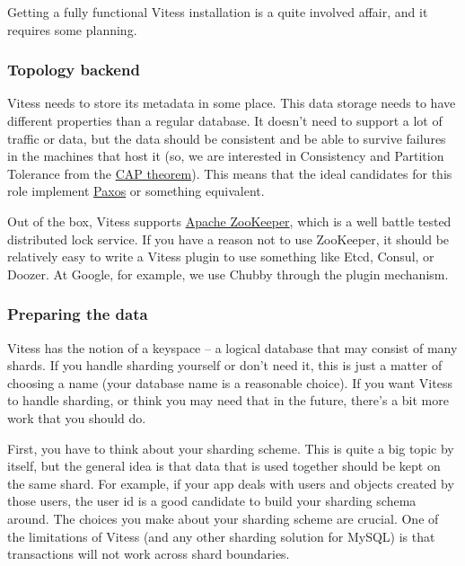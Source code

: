 Getting a fully functional Vitess installation is a quite involved affair, and
it requires some planning.

\subsubsection{Topology backend}\hypertarget{topology-backend}{}\label{topology-backend}

Vitess needs to store its metadata in some place. This data storage needs to
have different properties than a regular database. It doesn’t need to support a
lot of traffic or data, but the data should be consistent and be able to survive
failures in the machines that host it (so, we are interested in Consistency and
Partition Tolerance from the \href{http://en.wikipedia.org/wiki/CAP\_theorem}{CAP
theorem}). This means that the ideal candidates for this role implement
\href{http://en.wikipedia.org/wiki/Paxos\_(computer\_science)}{Paxos} or something
equivalent.

Out of the box, Vitess supports \href{http://zookeeper.apache.org/}{Apache ZooKeeper}, which is a well battle tested
distributed lock service. If you have a reason not to use ZooKeeper, it should
be relatively easy to write a Vitess plugin to use something like Etcd, Consul,
or Doozer. At Google, for example, we use Chubby through the plugin mechanism.

\subsubsection{Preparing the data}\hypertarget{preparing-the-data}{}\label{preparing-the-data}

Vitess has the notion of a keyspace – a logical database that may consist of
many shards. If you handle sharding yourself or don’t need it, this is just a
matter of choosing a name (your database name is a reasonable choice). If you
want Vitess to handle sharding, or think you may need that in the future,
there’s a bit more work that you should do.

First, you have to think about your sharding scheme. This is quite a big topic
by itself, but the general idea is that data that is used together should be
kept on the same shard. For example, if your app deals with users and objects
created by those users, the user id is a good candidate to build your sharding
schema around. The choices you make about your sharding scheme are crucial. One
of the limitations of Vitess (and any other sharding solution for MySQL) is that
transactions will not work across shard boundaries.

